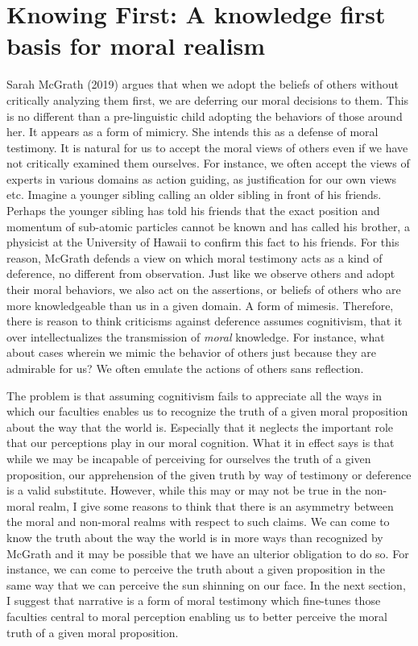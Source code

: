 \documentclass[
  letterpaper,
  DIV=11,
  numbers=noendperiod]{scrartcl}
\theoremstyle{remark}
\begin{document}
\section{Knowing First: A knowledge first basis for moral
realism}\label{knowing-first-a-knowledge-first-basis-for-moral-realism}

Sarah McGrath (2019) argues that when we adopt the beliefs of others
without critically analyzing them first, we are deferring our moral
decisions to them. This is no different than a pre-linguistic child
adopting the behaviors of those around her. It appears as a form of
mimicry. She intends this as a defense of moral testimony. It is natural
for us to accept the moral views of others even if we have not
critically examined them ourselves. For instance, we often accept the
views of experts in various domains as action guiding, as justification
for our own views etc. Imagine a younger sibling calling an older
sibling in front of his friends. Perhaps the younger sibling has told
his friends that the exact position and momentum of sub-atomic particles
cannot be known and has called his brother, a physicist at the
University of Hawaii to confirm this fact to his friends. For this
reason, McGrath defends a view on which moral testimony acts as a kind
of deference, no different from observation. Just like we observe others
and adopt their moral behaviors, we also act on the assertions, or
beliefs of others who are more knowledgeable than us in a given domain.
A form of mimesis. Therefore, there is reason to think criticisms
against deference assumes cognitivism, that it over intellectualizes the
transmission of \emph{moral} knowledge. For instance, what about cases
wherein we mimic the behavior of others just because they are admirable
for us? We often emulate the actions of others sans reflection.

The problem is that assuming cognitivism fails to appreciate all the
ways in which our faculties enables us to recognize the truth of a given
moral proposition about the way that the world is. Especially that it
neglects the important role that our perceptions play in our moral
cognition. What it in effect says is that while we may be incapable of
perceiving for ourselves the truth of a given proposition, our
apprehension of the given truth by way of testimony or deference is a
valid substitute. However, while this may or may not be true in the
non-moral realm, I give some reasons to think that there is an asymmetry
between the moral and non-moral realms with respect to such claims. We
can come to know the truth about the way the world is in more ways than
recognized by McGrath and it may be possible that we have an ulterior
obligation to do so. For instance, we can come to perceive the truth
about a given proposition in the same way that we can perceive the sun
shinning on our face. In the next section, I suggest that narrative is a
form of moral testimony which fine-tunes those faculties central to
moral perception enabling us to better perceive the moral truth of a
given moral proposition.
\end{document}
